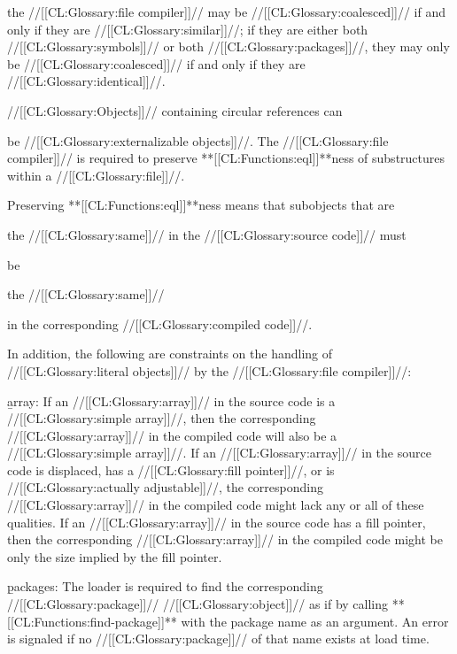 the //[[CL:Glossary:file compiler]]//
may be //[[CL:Glossary:coalesced]]// 
if and only if they are //[[CL:Glossary:similar]]//; 
if they are either both //[[CL:Glossary:symbols]]// or both //[[CL:Glossary:packages]]//,
they may only be //[[CL:Glossary:coalesced]]// if and only if they are //[[CL:Glossary:identical]]//.


//[[CL:Glossary:Objects]]// containing circular references can 

be //[[CL:Glossary:externalizable objects]]//.
The //[[CL:Glossary:file compiler]]// is required to preserve **[[CL:Functions:eql]]**ness of 
substructures within a //[[CL:Glossary:file]]//.

Preserving **[[CL:Functions:eql]]**ness means that subobjects that are

the //[[CL:Glossary:same]]//
in the //[[CL:Glossary:source code]]// must 

be

the //[[CL:Glossary:same]]//

in the corresponding //[[CL:Glossary:compiled code]]//.





In addition, the following are constraints on the handling of
//[[CL:Glossary:literal objects]]// by the //[[CL:Glossary:file compiler]]//:
 
\beginlist

 \item{}\b{array:} If an //[[CL:Glossary:array]]// in the source code is a
//[[CL:Glossary:simple array]]//, then the corresponding //[[CL:Glossary:array]]//
in the compiled code will also be a //[[CL:Glossary:simple array]]//.  If
an //[[CL:Glossary:array]]// in the source code is displaced, has a 
//[[CL:Glossary:fill pointer]]//, or is //[[CL:Glossary:actually adjustable]]//, the corresponding 
//[[CL:Glossary:array]]// in the compiled code might lack any or all of these
qualities. If an //[[CL:Glossary:array]]// in the source code has a fill
pointer, then the corresponding //[[CL:Glossary:array]]// in the compiled
code might be only the size implied by the fill pointer.

 \item{}\b{packages:} The loader is required to find the
corresponding //[[CL:Glossary:package]]// //[[CL:Glossary:object]]// as if by calling 
**[[CL:Functions:find-package]]** with the package name as an argument.  
An error  is signaled if no 
//[[CL:Glossary:package]]// of that name exists at load time.


